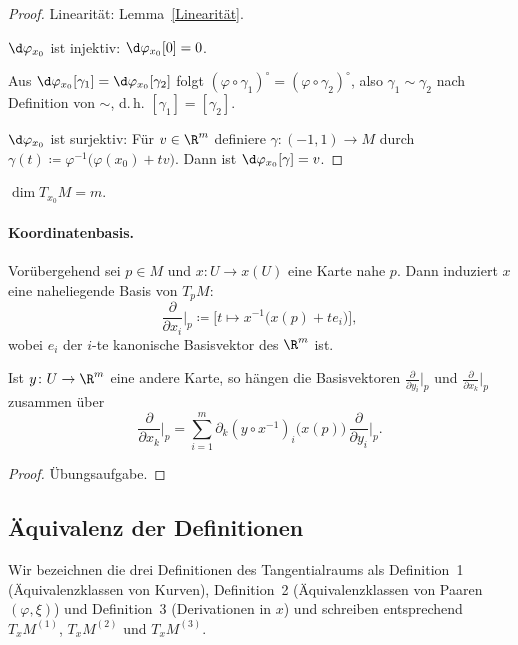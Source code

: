 \documentclass[11pt]{article}
\begin{document}
\begin{proof}
  Linearität: Lemma~\ref{Linearität}.

  $\d\varphi_{x_0}$ ist injektiv: $\d\varphi_{x_0}[0] = 0$.
\begin{ergaenzung}
  Aus $\d\varphi_{x_0}[\gamma_1] = \d\varphi_{x_0}[\gamma_2]$ folgt $(\varphi \circ \gamma_1)^{\circ} = (\varphi \circ \gamma_2)^{\circ}$, also $\gamma_1 \sim \gamma_2$ nach Definition von $\sim$, d.\,h. $[\gamma_1] = [\gamma_2]$.
  \end{ergaenzung}

  $\d\varphi_{x_0}$ ist surjektiv: Für $v \in \R^m$ definiere $\gamma \colon (-1, 1) \longrightarrow M$ durch $\gamma(t) \coloneqq \varphi^{-1}\bigl(\varphi(x_0) + tv\bigr)$. Dann ist $\d\varphi_{x_0}[\gamma] = v$.
\end{proof}


\begin{corollary}\Theorem
  $\dim T_{x_0} M = m$.
\end{corollary}

\paragraph{Koordinatenbasis.}
Vorübergehend sei $p \in M$ und $x \colon U \to x(U)$ eine Karte nahe $p$. Dann induziert $x$ eine naheliegende Basis von $T_p M$:
\[ \frac{\partial}{\partial x_i}\Big|_p \coloneqq \bigl[t \longmapsto x^{-1}\bigl(x(p) + t e_i\bigr)\bigr], \]
wobei $e_i$ der $i$-te kanonische Basisvektor des $\R^m$ ist.


\begin{lemma}[Basiswechsel]\Theorem
  Ist $y \colon U \to \R^m$ eine andere Karte, so hängen die Basisvektoren $\frac{\partial}{\partial y_i}\big|_p$ und $\frac{\partial}{\partial x_k}\big|_p$ zusammen über
  \[ \frac{\partial}{\partial x_k}\Big|_p = \sum_{i=1}^{m} \partial_k (y \circ x^{-1})_i \bigl(x(p)\bigr)\, \frac{\partial}{\partial y_i}\Big|_p. \]
\end{lemma}


\begin{proof}
  Übungsaufgabe.
\end{proof}



\subsection{Äquivalenz der Definitionen}

Wir bezeichnen die drei Definitionen des Tangentialraums als Definition~1 (Äquivalenzklassen von Kurven), Definition~2 (Äquivalenzklassen von Paaren $(\varphi, \xi)$) und Definition~3 (Derivationen in $x$) und schreiben entsprechend $T_x M^{(1)}$, $T_x M^{(2)}$ und $T_x M^{(3)}$.
\end{document}
